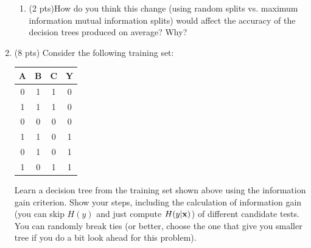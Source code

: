 \documentclass{article}
\def\x{{\bf x}}
\begin{document}
\begin{enumerate}
\begin{enumerate}
\item (2 pts)How do you think this change (using random splits vs. maximum information mutual information splits) would affect the accuracy of the decision trees produced on average?  Why?


\end{enumerate}
\item (8 pts) Consider the following training set:

\begin{center}
\begin{tabular}{|c|c|c|c|}\hline
A&B&C&Y\\ \hline
0&1&1&0 \\ \hline
1&1&1&0 \\ \hline
0&0&0&0 \\ \hline
1&1&0&1 \\ \hline
0&1&0&1 \\ \hline
1&0&1&1 \\ \hline
\end{tabular}
\end{center}

Learn a decision tree from the training set shown above using the information gain criterion. Show your steps, including the calculation of information gain (you can skip $H(y)$ and just compute $H(y|\x)$) of different candidate tests. You can randomly break ties (or better, choose the one that give you smaller tree if you do a bit look ahead for this problem).

\end{enumerate}
\end{document}
